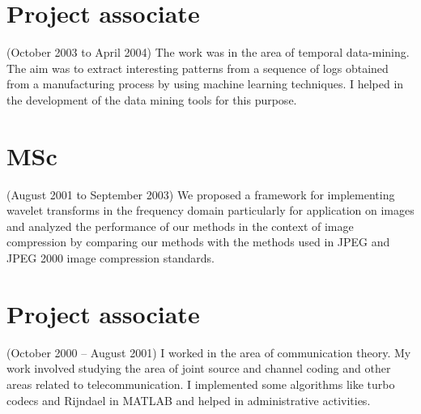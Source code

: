 \documentclass[margin,10pt]{res} %
\begin{document}
\begin{resume}
{\section{\textnormal{Project associate}}\label{sec:dataMining}
(October 2003 to April 2004)
The work was in the area of temporal data-mining. 
The aim was to extract interesting patterns from a sequence of logs
obtained from a manufacturing process by using machine learning techniques.
I helped in the development of the data mining tools for this purpose.
%
\section{\textnormal{MSc}}\label{sec:mastersAbstract}
(August 2001 to September 2003)
We proposed a
framework for implementing wavelet transforms in the frequency domain
particularly for application on images and analyzed the performance of our
methods in the context of image compression by comparing our methods with
the methods used in JPEG and JPEG 2000 image compression
standards. 
\section{\textnormal{Project associate}}\label{sec:turbo}
(October 2000 -- August 2001)
I worked in the area of communication theory. My work involved studying
the area of joint source and channel coding and other areas related to
telecommunication. I implemented some algorithms like turbo codecs and
Rijndael in MATLAB and helped in administrative activities.

}
\end{resume}
\end{document}
